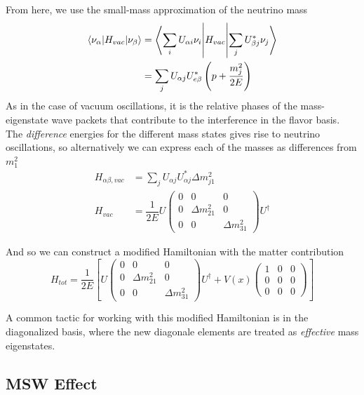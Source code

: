 \documentclass[main.tex]{subfiles}
\begin{document}
From here, we use the small-mass approximation of the neutrino mass
\begin{align} 
    \left< \nu_{\alpha} | H_{vac} | \nu_{\beta}  \right> &= \left<  \sum_{i} U_{\alpha i} \nu_{i} \middle| H_{vac} \middle| \sum_{j} U_{\beta j}^{*}\nu_{j} \right>  \\
    &=  \sum\limits_{j} U_{\alpha j} U^{*}_{e\beta}\left( p + \dfrac{m_{j}^{2}}{2E} \right)
\end{align}
As in the case of vacuum oscillations, it is the relative phases of the mass-eigenstate wave packets that contribute to the interference in the flavor basis. 
The \textit{difference} energies for the different mass states gives rise to neutrino oscillations, so alternatively we can express each of the masses as differences from $m_{1}^{2}$ 
\begin{align}
    H_{\alpha \beta, vac } &= \sum\limits_{j} U_{\alpha j} U^{*}_{\alpha j} \Delta m^{2}_{j1}\\
    H_{vac }&= \dfrac{1}{2E} U\left(\begin{array}{ccc} 0 & 0 & 0 \\ 0 & \Delta m_{21}^{2} & 0 \\ 0 & 0 & \Delta m_{31}^{2} \end{array}\right)U^{\dag} \label{eq:hamy}
\end{align}

And so we can construct a modified Hamiltonian with the matter contribution 
\begin{equation}
    H_{tot }= \dfrac{1}{2E} \left[ U\left(\begin{array}{ccc} 0 & 0 & 0 \\ 0 & \Delta m_{21}^{2} & 0 \\ 0 & 0 & \Delta m_{31}^{2} \end{array}\right)U^{\dag} + V(x)\left(\begin{array}{ccc} 1&0&0\\0&0&0 \\0&0&0 \end{array}\right)  \right]
\end{equation}

A common tactic for working with this modified Hamiltonian is in the diagonalized basis, where the new diagonale elements are treated as \textit{effective} mass eigenstates. 


\subsection{MSW Effect}
\end{document}
